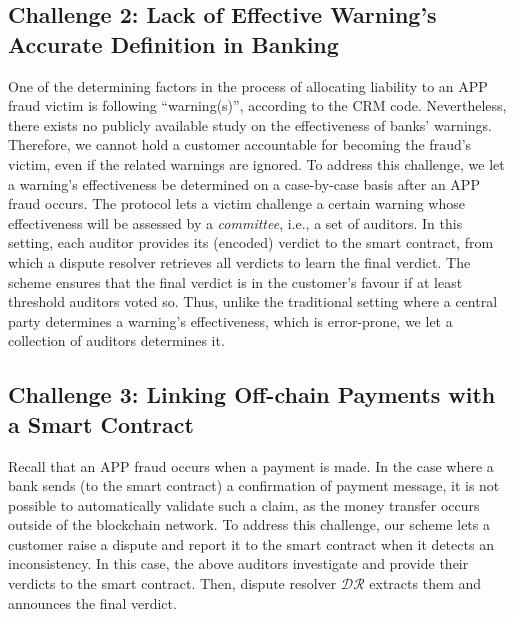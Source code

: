 


\vspace{-3mm}
\subsection{Challenge 2: Lack of Effective Warning's Accurate Definition in Banking}\label{sec::Lack-of-Effective-Warning-Definition}


One of the determining factors in the process of allocating liability to an APP fraud victim is following ``warning(s)'', according to the CRM code. Nevertheless, there exists no publicly available study on the effectiveness of banks' warnings. Therefore, we cannot hold a customer accountable for becoming the fraud's victim,  even if the related warnings are ignored. To address this challenge, we let a warning's effectiveness be determined on a case-by-case basis after an APP fraud occurs. The protocol lets a victim challenge a certain warning whose effectiveness will be assessed by a \emph{committee}, i.e., a  set of auditors. In this setting, each auditor provides its (encoded) verdict to the smart contract, from which a dispute resolver retrieves all verdicts to learn the final verdict. The scheme ensures that the final verdict is in the customer's favour if at least threshold auditors voted so. Thus, unlike the traditional setting where a central party determines a warning's effectiveness, which is error-prone, we let a collection of auditors determines it.



\vspace{-3.5mm}

\subsection{Challenge 3: Linking Off-chain Payments with a Smart Contract}\label{sec::Linking Off-chain-Payments-with-contract}
 Recall that an APP fraud occurs when a payment is made. In the case where a  bank sends  (to the smart contract) a confirmation of payment message, it is not possible to automatically validate such a claim, as the money transfer occurs outside of the blockchain network. To address this challenge, our scheme lets a customer raise a dispute and report it to the smart contract when it detects an inconsistency. In this case, the above auditors investigate and provide their verdicts to the smart contract. Then, dispute resolver $\mathcal{DR}$ extracts them and announces the final verdict. 


